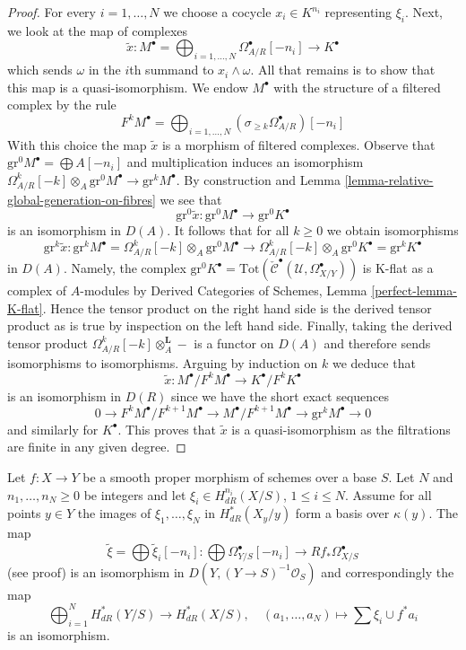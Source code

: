 \begin{proof}
\medskip\noindent
For every $i = 1, \ldots, N$ we choose a cocycle $x_i \in K^{n_i}$
representing $\xi_i$. Next, we look at the map of complexes
$$
\tilde x :
M^\bullet = \bigoplus\nolimits_{i = 1, \ldots, N}
\Omega^\bullet_{A/R}[-n_i]
\longrightarrow
K^\bullet
$$
which sends $\omega$ in the $i$th summand to $x_i \wedge \omega$.
All that remains is to show that this map is a quasi-isomorphism.
We endow $M^\bullet$ with the structure of a filtered complex
by the rule
$$
F^kM^\bullet =
\bigoplus\nolimits_{i = 1, \ldots, N}
(\sigma_{\geq k}\Omega^\bullet_{A/R})[-n_i]
$$
With this choice the map $\tilde x$ is a morphism of filtered complexes.
Observe that $\text{gr}^0M^\bullet = \bigoplus A[-n_i]$
and multiplication induces an isomorphism
$\Omega^k_{A/R}[-k] \otimes_A \text{gr}^0M^\bullet \to \text{gr}^kM^\bullet$.
By construction and Lemma \ref{lemma-relative-global-generation-on-fibres}
we see that
$$
\text{gr}^0\tilde x :
\text{gr}^0M^\bullet \longrightarrow
\text{gr}^0K^\bullet
$$
is an isomorphism in $D(A)$. It follows that for all $k \geq 0$
we obtain isomorphisms
$$
\text{gr}^k \tilde x :
\text{gr}^kM^\bullet = \Omega^k_{A/R}[-k] \otimes_A \text{gr}^0M^\bullet
\longrightarrow
\Omega^k_{A/R}[-k] \otimes_A \text{gr}^0K^\bullet =
\text{gr}^kK^\bullet
$$
in $D(A)$. Namely, the complex
$\text{gr}^0K^\bullet =
\text{Tot}(\check{\mathcal{C}}^\bullet(\mathcal{U}, \Omega_{X/Y}^\bullet))$
is K-flat as a complex of $A$-modules by Derived Categories of Schemes,
Lemma \ref{perfect-lemma-K-flat}.
Hence the tensor product on the right hand side is the
derived tensor product as is true by inspection on the left hand side.
Finally, taking the derived tensor product
$\Omega^k_{A/R}[-k] \otimes_A^\mathbf{L} -$ is a functor on $D(A)$
and therefore sends isomorphisms to isomorphisms.
Arguing by induction on $k$ we deduce that
$$
\tilde x : M^\bullet/F^kM^\bullet \to K^\bullet/F^kK^\bullet
$$
is an isomorphism in $D(R)$ since we have the short exact sequences
$$
0 \to F^kM^\bullet/F^{k + 1}M^\bullet \to
M^\bullet/F^{k + 1}M^\bullet \to
\text{gr}^kM^\bullet \to 0
$$
and similarly for $K^\bullet$. This proves that $\tilde x$ is a
quasi-isomorphism as the filtrations are finite in any given degree.
\end{proof}

\begin{proposition}
\label{proposition-global-generation-on-fibres}
Let $f : X \to Y$ be a smooth proper morphism of schemes over a base $S$.
Let $N$ and $n_1, \ldots, n_N \geq 0$ be integers and let
$\xi_i \in H^{n_i}_{dR}(X/S)$, $1 \leq i \leq N$.
Assume for all points $y \in Y$ the images of $\xi_1, \ldots, \xi_N$
in $H^*_{dR}(X_y/y)$ form a basis over $\kappa(y)$. The map
$$
\tilde \xi = \bigoplus \tilde \xi_i[-n_i] :
\bigoplus \Omega^\bullet_{Y/S}[-n_i]
\longrightarrow
Rf_*\Omega^\bullet_{X/S}
$$
(see proof) is an isomorphism in $D(Y, (Y \to S)^{-1}\mathcal{O}_S)$ and
correspondingly the map
$$
\bigoplus\nolimits_{i = 1}^N H^*_{dR}(Y/S) \longrightarrow
H^*_{dR}(X/S), \quad
(a_1, \ldots, a_N) \longmapsto  \sum \xi_i \cup f^*a_i
$$
is an isomorphism.
\end{proposition}

